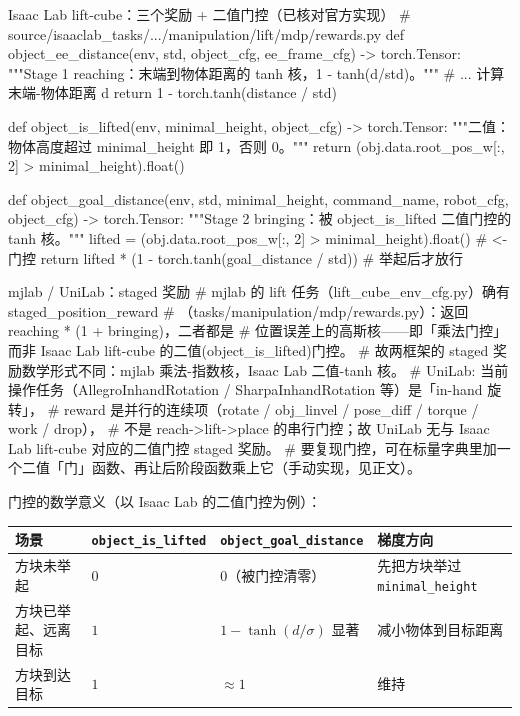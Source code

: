 \begin{codebox}[Python]{Isaac Lab lift-cube：三个奖励 + 二值门控（已核对官方实现）}
# source/isaaclab_tasks/.../manipulation/lift/mdp/rewards.py
def object_ee_distance(env, std, object_cfg, ee_frame_cfg) -> torch.Tensor:
    """Stage 1 reaching：末端到物体距离的 tanh 核，1 - tanh(d/std)。"""
    # ... 计算末端-物体距离 d
    return 1 - torch.tanh(distance / std)

def object_is_lifted(env, minimal_height, object_cfg) -> torch.Tensor:
    """二值：物体高度超过 minimal_height 即 1，否则 0。"""
    return (obj.data.root_pos_w[:, 2] > minimal_height).float()

def object_goal_distance(env, std, minimal_height, command_name,
                         robot_cfg, object_cfg) -> torch.Tensor:
    """Stage 2 bringing：被 object_is_lifted 二值门控的 tanh 核。"""
    lifted = (obj.data.root_pos_w[:, 2] > minimal_height).float()   # <- 门控
    return lifted * (1 - torch.tanh(goal_distance / std))           # 举起后才放行
\end{codebox}

\begin{codebox}[Python]{mjlab / UniLab：staged 奖励}
# mjlab 的 lift 任务（lift_cube_env_cfg.py）确有 staged_position_reward
# （tasks/manipulation/mdp/rewards.py）：返回 reaching * (1 + bringing)，二者都是
# 位置误差上的高斯核——即「乘法门控」而非 Isaac Lab lift-cube 的二值(object_is_lifted)门控。
# 故两框架的 staged 奖励数学形式不同：mjlab 乘法-指数核，Isaac Lab 二值-tanh 核。
# UniLab: 当前操作任务（AllegroInhandRotation / SharpaInhandRotation 等）是「in-hand 旋转」，
#   reward 是并行的连续项（rotate / obj_linvel / pose_diff / torque / work / drop），
#   不是 reach->lift->place 的串行门控；故 UniLab 无与 Isaac Lab lift-cube 对应的二值门控 staged 奖励。
#   要复现门控，可在标量字典里加一个二值「门」函数、再让后阶段函数乘上它（手动实现，见正文）。
\end{codebox}

门控的数学意义（以 Isaac Lab 的二值门控为例）：

\begin{center}
\small
\begin{tabular}{@{}llll@{}}
\toprule
场景 & \verb|object_is_lifted| & \verb|object_goal_distance| & 梯度方向 \\
\midrule
方块未举起 & $0$ & $0$（被门控清零） & 先把方块举过 \verb|minimal_height| \\
方块已举起、远离目标 & $1$ & $1-\tanh(d/\sigma)$ 显著 & 减小物体到目标距离 \\
方块到达目标 & $1$ & $\approx1$ & 维持 \\
\bottomrule
\end{tabular}
\end{center}

